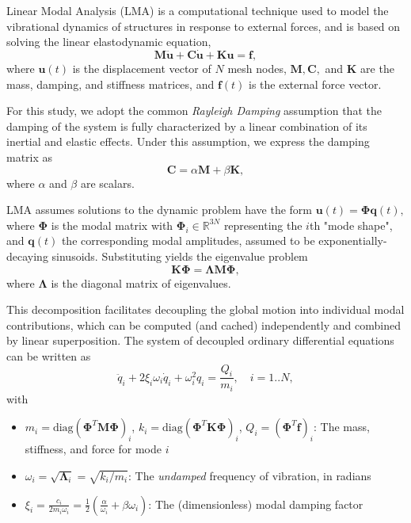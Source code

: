 \documentclass[12pt]{article}
\newcommand{\vct}[1]{\mathbf{#1}}
\newcommand{\mtx}[1]{\mathbf{#1}}
\begin{document}
Linear Modal Analysis (LMA) is a computational technique used to model the vibrational dynamics of structures in response to external forces, and is based on solving the linear elastodynamic equation,
$$\mtx{M}\ddot{\vct{u}} + \mtx{C}\dot{\mtx{u}} + \mtx{K}\vct{u} = \vct{f},$$
where $\vct{u}(t)$ is the displacement vector of $N$ mesh nodes, $\mtx{M}, \mtx{C},$ and $\mtx{K}$ are the mass, damping, and stiffness matrices, and $\vct{f}(t)$ is the external force vector.

For this study, we adopt the common \textit{Rayleigh Damping} assumption that the damping of the system is fully characterized by a linear combination of its inertial and elastic effects.
Under this assumption, we express the damping matrix as
$$\mtx{C} = \alpha \mtx{M} + \beta \mtx{K},$$
where \(\alpha\) and \(\beta\) are scalars.

LMA assumes solutions to the dynamic problem have the form $\vct{u}(t) = \mtx{\Phi}\vct{q}(t),$ where $\mtx{\Phi}$ is the modal matrix with $\mtx{\Phi}_i \in \mathbb{R}^{3N}$ representing the $i$th "mode shape", and $\vct{q}(t)$ the corresponding modal amplitudes, assumed to be exponentially-decaying sinusoids.
Substituting yields the eigenvalue problem
\begin{equation}\label{eq:EigenvalueProblem}
  \mtx{K}\mtx{\Phi} = \mtx{\Lambda} \mtx{M}\mtx{\Phi},
\end{equation}
where $\mtx{\Lambda}$ is the diagonal matrix of eigenvalues.

This decomposition facilitates decoupling the global motion into individual modal contributions, which can be computed (and cached) independently and combined by linear superposition.
The system of decoupled ordinary differential equations can be written as
$$\ddot{q}_i + 2\xi_i \omega_i \dot{q}_i + \omega_i^2 q_i = \frac{Q_i}{m_i}, \quad i = 1..N,$$
with
\begin{itemize}
  \item $m_i = \text{diag}(\mtx{\Phi}^T \mtx{M} \mtx{\Phi})_i$, $k_i = \text{diag}(\mtx{\Phi}^T \mtx{K} \mtx{\Phi})_i$, $Q_i = (\mtx{\Phi}^T \vct{f})_i$: The mass, stiffness, and force for mode $i$
  \item $\omega_i = \sqrt{\mtx{\Lambda}_i} = \sqrt{k_i / m_i}$: The \textit{undamped} frequency of vibration, in radians
  \item $\xi_i = \frac{c_i}{2m_i\omega_i} = \frac{1}{2} \left(\frac{\alpha}{\omega_i} + \beta\omega_i\right)$: The (dimensionless) modal damping factor
\end{itemize}
\end{document}

